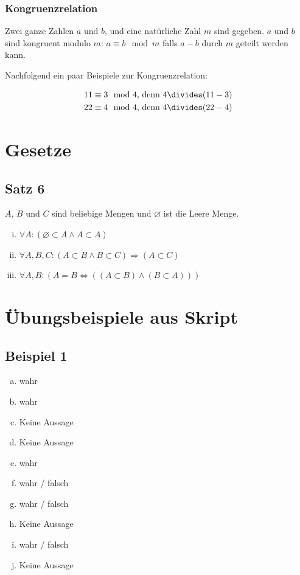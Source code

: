 \documentclass[12pt, a4paper, oneside]{article}
\begin{document}
\subsubsection{Kongruenzrelation}
Zwei ganze Zahlen $a$ und $b$, und eine natürliche Zahl $m$ sind gegeben. $a$ und $b$ sind kongruent modulo $m$: $a \equiv b \mod m $ falls $a - b$ durch $m$ geteilt werden kann.

Nachfolgend ein paar Beispiele zur Kongruenzrelation:

\begin{equation*}
  \begin{split}
    11 \equiv 3 & \mod 4 \text{, denn } 4 \divides (11 - 3)\\
    22 \equiv 4 & \mod 4 \text{, denn } 4 \divides (22 - 4)
  \end{split}
\end{equation*}

%
%
\newpage
\section{Gesetze}
\subsection{Satz 6}
$A$, $B$ und $C$ sind beliebige Mengen und $\varnothing$ ist die Leere Menge.
\begin{enumerate}[(i)]
  \item $\forall A : (\varnothing \subset A \land A \subset A) $
  \item $\forall A, B, C : (A \subset B \land B \subset C) \Longrightarrow (A \subset C)$
  \item $\forall A, B : (A = B \Longleftrightarrow ((A \subset B) \land (B \subset A)))$
  
\end{enumerate}

\newpage 
\section{Übungsbeispiele aus Skript} 
\subsection{Beispiel 1}
\begin{enumerate}[(a)]
  \item wahr
  \item wahr
  \item Keine Aussage
  \item Keine Aussage
  \item wahr
  \item wahr / falsch
  \item wahr / falsch
  \item Keine Aussage
  \item wahr / falsch
  \item Keine Aussage
\end{enumerate}
\end{document}
